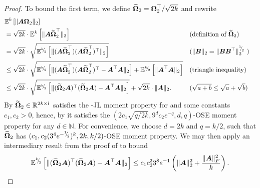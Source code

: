 \documentclass[12pt]{article}
\begin{document}
\begin{proof}
    To bound the first term, we define $\widetilde{\boldsymbol{\Omega}}_2 = \boldsymbol{\Omega}_2^{\top} / \sqrt{2k}$ and rewrite
    \begin{align}
        &\mathbb{E}^{k}\left[ \lVert \mtx{A} \mtx{\Omega}_2 \rVert _2 \right] \notag \\
        &= \sqrt{2k} \cdot \mathbb{E}^{k}\left[ \lVert \mtx{A} \widetilde{\mtx{\Omega}}_2^{\top} \rVert _2 \right] && \text{(definition of $\widetilde{\mtx{\Omega}}_2$)} \notag \\
        &= \sqrt{2k} \cdot \sqrt{ \mathbb{E}^{\sfrac{k}{2}}\left[ \lVert (\mtx{A} \widetilde{\mtx{\Omega}}_2^{\top}) (\mtx{A} \widetilde{\mtx{\Omega}}_2^{\top})^{\top} \rVert _2 \right] } && \text{($\lVert \mtx{B} \rVert _2 = \lVert \mtx{B} \mtx{B}^{\top} \rVert _2^{\sfrac{1}{2}} $ )} \notag \\
        &\leq \sqrt{2k} \cdot \sqrt{ \mathbb{E}^{\sfrac{k}{2}}\left[ \lVert (\mtx{A} \widetilde{\mtx{\Omega}}_2^{\top}) (\mtx{A} \widetilde{\mtx{\Omega}}_2^{\top})^{\top} - \mtx{A}^{\top} \mtx{A} \rVert _2 \right] + \mathbb{E}^{\sfrac{k}{2}}\left[ \lVert \mtx{A}^{\top} \mtx{A} \rVert _2 \right]} && \text{(triangle inequality)} \notag \\
        &\leq \sqrt{2k} \cdot \sqrt{ \mathbb{E}^{\sfrac{k}{2}}\left[ \lVert (\widetilde{\mtx{\Omega}}_2 \mtx{A} )^{\top} (\widetilde{\mtx{\Omega}}_2 \mtx{A}) - \mtx{A}^{\top} \mtx{A} \rVert _2\right]} + \sqrt{2k} \cdot \lVert \mtx{A} \rVert _2. && \text{($\sqrt{a+b} \leq \sqrt{a} + \sqrt{b}$)}
    \end{align}
    By \cite{} $\widetilde{\boldsymbol{\Omega}}_2 \in \mathbb{R}^{2k \times l}$ satisfies the -JL moment property for  and some constants $c_1, c_2 > 0$, hence, by \cite[Lemma 4]{cohen-2016-optimal-approximate} it satisfies the $(2 c_1 \sqrt{q/2k}, 9^d c_2 e^{-q}, d, q)$-OSE moment property for any $d \in \mathbb{N}$. For convenience, we choose $d=2k$ and $q=k/2$, such that $\widetilde{\boldsymbol{\Omega}}_2$ has $(c_1, c_2 (3^4e^{-{}^{1}{\mskip -5mu/\mskip -3mu}_{2}})^k, 2k, k/2)$-OSE moment property. We may then apply an intermediary result from the proof of \cite[Theorem 1]{cohen-2016-optimal-approximate} to bound
    \begin{equation}
        \mathbb{E}^{{}^{k}{\mskip -5mu/\mskip -3mu}_{2}}\left[ \lVert (\widetilde{\boldsymbol{\Omega}}_2 \boldsymbol{A} )^{\top} (\widetilde{\boldsymbol{\Omega}}_2 \boldsymbol{A}) - \boldsymbol{A}^{\top} \boldsymbol{A} \rVert _2\right] \leq c_1 c_2^2 3^8e^{-1} \left( \lVert \boldsymbol{A} \rVert _2^2 + \frac{\lVert \boldsymbol{A} \rVert _F^2}{k} \right).
    \end{equation}

\end{proof}
\end{document}
